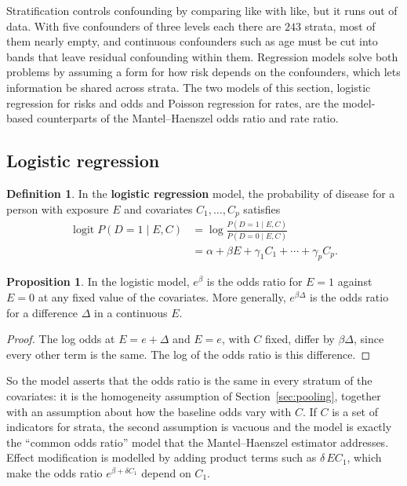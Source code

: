 \documentclass[11pt,a4paper]{article}
\numberwithin{equation}{section}
\theoremstyle{definition}
\newtheorem{defn}[thm]{Definition}
\newtheorem{prop}[thm]{Proposition}
\begin{document}
Stratification controls confounding by comparing like with like, but it runs out of data. With five confounders of three levels each
there are $243$ strata, most of them nearly empty, and continuous confounders such as age must be cut into bands that leave residual
confounding within them. Regression models solve both problems by assuming a form for how risk depends on the confounders, which lets
information be shared across strata. The two models of this section, logistic regression for risks and odds and Poisson regression for
rates, are the model-based counterparts of the Mantel--Haenszel odds ratio and rate ratio.

\subsection{Logistic regression}

\begin{defn}
In the \textbf{logistic regression} model, the probability of disease for a person with exposure $E$ and covariates $C_1, \dots, C_p$ satisfies
\begin{align*}
\operatorname{logit} P(D = 1 \mid E, C) &= \log\frac{P(D = 1 \mid E, C)}{P(D = 0 \mid E, C)} \\
&= \alpha + \beta E + \gamma_1 C_1 + \cdots + \gamma_p C_p .
\end{align*}
\end{defn}

\begin{prop}
\label{prop:logitor}
In the logistic model, $e^\beta$ is the odds ratio for $E = 1$ against $E = 0$ at any fixed value of the covariates. More generally, $e^{\beta\Delta}$ is the odds ratio for
a difference $\Delta$ in a continuous $E$.
\end{prop}

\begin{proof}
The log odds at $E = e + \Delta$ and $E = e$, with $C$ fixed, differ by $\beta\Delta$, since every other term is the same. The log of the odds ratio is this difference.
\end{proof}

So the model asserts that the odds ratio is the same in every stratum of the covariates: it is the homogeneity assumption of
Section~\ref{sec:pooling}, together with an assumption about how the baseline odds vary with $C$. If $C$ is a set of indicators for strata,
the second assumption is vacuous and the model is exactly the ``common odds ratio'' model that the Mantel--Haenszel estimator addresses.
Effect modification is modelled by adding product terms such as $\delta\,E C_1$, which make the odds ratio $e^{\beta + \delta C_1}$ depend on $C_1$.
\end{document}
